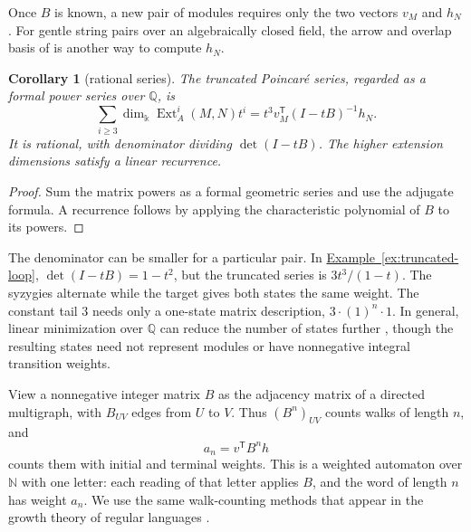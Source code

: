 \documentclass[reqno]{amsart}
\makeatletter
\def\section{\@startsection{section}{3}\z@{.8\linespacing\@plus.7\linespacing}{1\linespacing}{\normalfont\Large\bfseries \centering}}
\numberwithin{equation}{section}
\newtheorem{corollary}[theorem]{Corollary}
\theoremstyle{definition}
\theoremstyle{remark}
\DeclareMathOperator{\Ext}{Ext}
\newcommand{\transpose}{^{\mathsf T}}
\newcommand{\kk}{\Bbbk}
\newcommand{\kdim}{\dim_{\kk}}
\newcommand{\exref}[1]{\hyperref[#1]{Example~\ref*{#1}}}
\makeatother
\begin{document}
Once \(B\) is known, a new pair of modules requires only the two vectors \(v_M\) and \(h_N\). For gentle string pairs over an algebraically closed field, the arrow and overlap basis of \cite[Theorem~A]{CPS} is another way to compute \(h_N\).

\begin{corollary}[rational series]\label{cor:series}
The truncated Poincar\'e series, regarded as a formal power series over \(\mathbb Q\), is
\[
 \sum_{i\ge3}\kdim\Ext_A^i(M,N)t^i
   =t^3v_M\transpose(I-tB)^{-1}h_N.
\]
It is rational, with denominator dividing \(\det(I-tB)\). The higher extension dimensions satisfy a linear recurrence.
\end{corollary}
\begin{proof}
Sum the matrix powers as a formal geometric series and use the adjugate formula. A recurrence follows by applying the characteristic polynomial of \(B\) to its powers.
\end{proof}


The denominator can be smaller for a particular pair. In \exref{ex:truncated-loop}, \(\det(I-tB)=1-t^2\), but the truncated series is \(3t^3/(1-t)\). The syzygies alternate while the target gives both states the same weight. The constant tail \(3\) needs only a one-state matrix description, \(3\cdot(1)^n\cdot1\). In general, linear minimization over \(\mathbb Q\) can reduce the number of states further \cite[\S2.3]{BerstelReutenauer11}, though the resulting states need not represent modules or have nonnegative integral transition weights.

\section{Growth from the syzygy graph}\label{sec:growth}

View a nonnegative integer matrix \(B\) as the adjacency matrix of a directed multigraph, with \(B_{UV}\) edges from \(U\) to \(V\). Thus \((B^n)_{UV}\) counts walks of length \(n\), and
\[
 a_n=v\transpose B^nh
\]
counts them with initial and terminal weights. This is a weighted automaton over \(\mathbb N\) with one letter: each reading of that letter applies \(B\), and the word of length \(n\) has weight \(a_n\). We use the same walk-counting methods that appear in the growth theory of regular languages \cite{GKRS10}.
\end{document}
